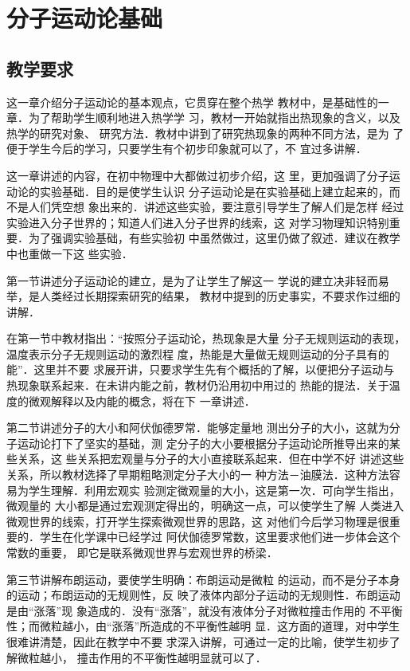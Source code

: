 
\chapter{分子运动论基础}
\minitoc[n]

\section{教学要求}
这一章介绍分子运动论的基本观点，它贯穿在整个热学
教材中，是基础性的一章．为了帮助学生顺利地进入热学学
习，教材一开始就指出热现象的含义，以及热学的研究对象、
研究方法．教材中讲到了研究热现象的两种不同方法，是为
了便于学生今后的学习，只要学生有个初步印象就可以了，不
宜过多讲解．

这一章讲述的内容，在初中物理中大都做过初步介绍，这
里，更加强调了分子运动论的实验基础．目的是使学生认识
分子运动论是在实验基础上建立起来的，而不是人们凭空想
象出来的．讲述这些实验，要注意引导学生了解人们是怎样
经过实验进入分子世界的；知道人们进入分子世界的线索，这
对学习物理知识特别重要．为了强调实验基础，有些实验初
中虽然做过，这里仍做了叙述．建议在教学中也重做一下这
些实验．

第一节讲述分子运动论的建立，是为了让学生了解这一
学说的建立决非轻而易举，是人类经过长期探索研究的结果，
教材中提到的历史事实，不要求作过细的讲解．

在第一节中教材指出：“按照分子运动论，热现象是大量
分子无规则运动的表现，温度表示分子无规则运动的激烈程
度，热能是大量做无规则运动的分子具有的能”．这里并不要
求展开讲，只要求学生先有个概括的了解，以便把分子运动与
热现象联系起来．在未讲内能之前，教材仍沿用初中用过的
热能的提法．关于温度的微观解释以及内能的概念，将在下
一章讲述．

第二节讲述分子的大小和阿伏伽德罗常．能够定量地
测出分子的大小，这就为分子运动论打下了坚实的基础，测
定分子的大小要根据分子运动论所推导出来的某些关系，这
些关系把宏观量与分子的大小直接联系起来．但在中学不好
讲述这些关系，所以教材选择了早期粗略测定分子大小的一
种方法－油膜法．这种方法容易为学生理解．利用宏观实
验测定微观量的大小，这是第一次．可向学生指出，微观量的
大小都是通过宏观测定得出的，明确这一点，可以使学生了解
人类进入微观世界的线索，打开学生探索微观世界的思路，这
对他们今后学习物理是很重要的．学生在化学课中已经学过
阿伏伽德罗常数，这里要求他们进一步体会这个常数的重要，
即它是联系微观世界与宏观世界的桥梁．

第三节讲解布朗运动，要使学生明确：布朗运动是微粒
的运动，而不是分子本身的运动；布朗运动的无规则性，反
映了液体内部分子运动的无规则性．布朗运动是由“涨落”现
象造成的．没有“涨落”，就没有液体分子对微粒撞击作用的
不平衡性；而微粒越小，由“涨落”所造成的不平衡性越明
显．这方面的道理，对中学生很难讲清楚，因此在教学中不要
求深入讲解，可通过一定的比喻，使学生初步了解微粒越小，
撞击作用的不平衡性越明显就可以了．

